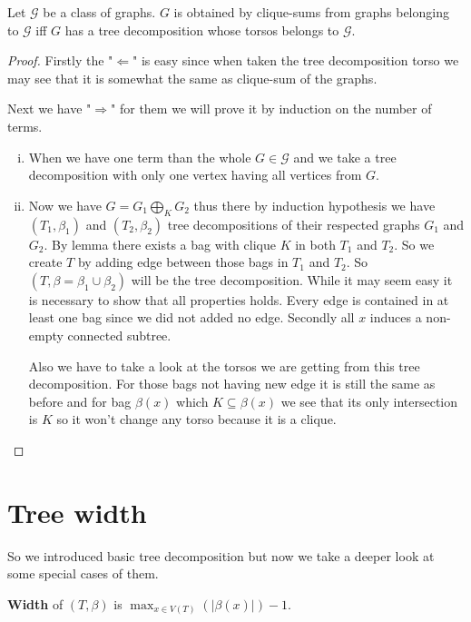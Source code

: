 \begin{lemma}
	Let $\mathcal{G}$ be a class of graphs. $G$ is obtained by clique-sums from graphs belonging to $\mathcal{G}$ iff $G$ has a tree decomposition whose torsos belongs to $\mathcal{G}$.
\end{lemma}

\begin{proof}
	Firstly the "$\Leftarrow$" is easy since when taken the tree decomposition torso we may see that it is somewhat the same as clique-sum of the graphs.
	
	Next we have "$\Rightarrow$" for them we will prove it by induction on the number of terms.
	
	\begin{enumerate}[(i)]
		\item When we have one term than the whole $G \in \mathcal{G}$ and we take a tree decomposition with only one vertex having all vertices from $G$.
		\item Now we have $G = G_{1} \bigoplus_{K} G_{2}$ thus there by induction hypothesis we have $(T_{1}, \beta_{1})$ and $(T_{2}, \beta_{2})$ tree decompositions of their respected graphs $G_{1}$ and $G_{2}$. By lemma there exists a bag with clique $K$ in both $T_{1}$ and $T_{2}$. So we create $T$ by adding edge between those bags in $T_{1}$ and $T_{2}$. So $(T, \beta = \beta_{1} \cup \beta_{2})$ will be the tree decomposition. While it may seem easy it is necessary to show that all properties holds. Every edge is contained in at least one bag since we did not added no edge. Secondly all $x$ induces a non-empty connected subtree.
		
		Also we have to take a look at the torsos we are getting from this tree decomposition. For those bags not having new edge it is still the same as before and for bag $\beta(x)$ which $K \subseteq \beta(x)$ we see that its only intersection is $K$ so it won't change any torso because it is a clique.
	\end{enumerate}
\end{proof}

\section{Tree width}

So we introduced basic tree decomposition but now we take a deeper look at some special cases of them.

\begin{defn}
	\textbf{Width} of $(T, \beta)$ is $\max_{x \in V(T)} (|\beta(x)|) -1$.
\end{defn}

